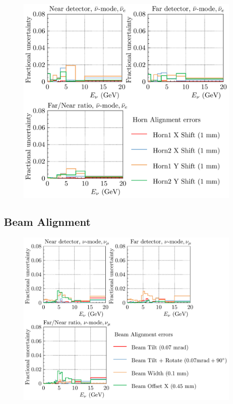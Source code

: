 \documentclass{article}
\begin{document}
\begin{figure}
  \includegraphics[width=\textwidth]{plots/fracerrs/nubarmode_nuebar_HornAlignment}
  \caption{}
  \label{fig:beamalign_nubar_nuebar}
\end{figure}

\subsection{Beam Alignment}

\begin{figure}
  \includegraphics[width=\textwidth]{plots/fracerrs/numode_numu_BeamAlignment}
  \caption{}
  \label{fig:beamalign_nu_numu}
\end{figure}
\end{document}
